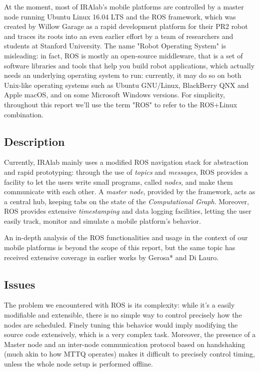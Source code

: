 \documentclass[a4paper,12pt]{report}
\begin{document}
At the moment, most of IRAlab's mobile platforms are controlled by a master node running Ubuntu Linux 16.04 LTS and the ROS framework, which was created by Willow Garage as a rapid development platform for their PR2 robot and traces its roots into an even earlier effort by a team of researchers and students at Stanford University. The name "Robot Operating System" is misleading: in fact, ROS is mostly an open-source middleware, that is a set of software libraries and tools that help you build robot applications, which actually needs an underlying operating system to run: currently, it may do so on both Unix-like operating systems such as Ubuntu GNU/Linux, BlackBerry QNX\cite{qnx-ros} and Apple macOS, and on some Microsoft Windows versions. For simplicity, throughout this report we'll use the term "ROS" to refer to the ROS+Linux combination.

\subsection{Description}

Currently, IRAlab mainly uses a modified ROS navigation stack for abstraction and rapid prototyping: through the use of \textit{topics} and \textit{messages}, ROS provides a facility to let the users write small programs, called \textit{nodes}, and make them communicate with each other. A \textit{master node}, provided by the framework, acts as a central hub, keeping tabs on the state of the \textit{Computational Graph}. Moreover, ROS provides extensive \textit{timestamping} and data logging facilities, letting the user easily track, monitor and simulate a mobile platform's behavior.

An in-depth analysis of the ROS functionalities and usage in the context of our mobile platforms is beyond the scope of this report, but the same topic has received extensive coverage in earlier works by Gerosa* and Di Lauro\cite{fdila-bs-otto}.

\subsection{Issues}

The problem we encountered with ROS is its complexity: while it's a easily modifiable and extensible, there is no simple way to control precisely how the nodes are scheduled. Finely tuning this behavior would imply modifying the source code extensively, which is a very complex task.  Moreover, the presence of a Master node and an inter-node communication protocol based on handshaking (much akin to how MTTQ operates) makes it difficult to precisely control timing, unless the whole node setup is performed offline.
\end{document}
